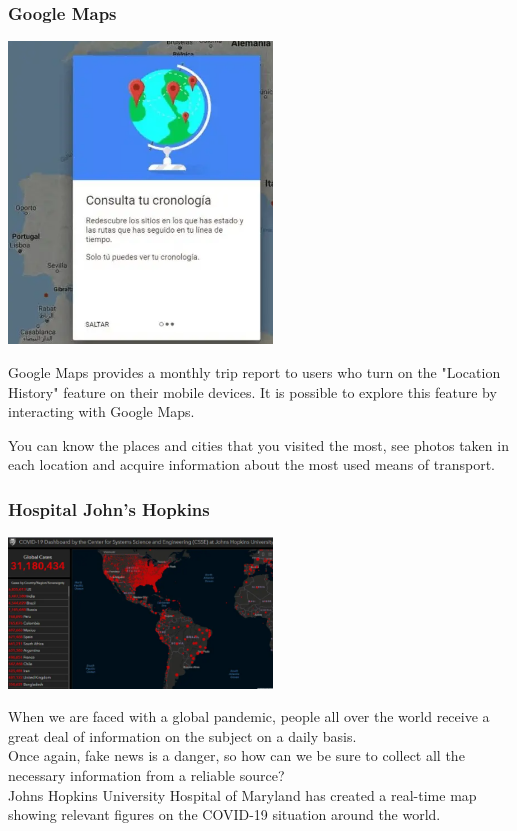 \documentclass{article}
\begin{document}
\begin{multicols}{2}
\subsubsection{Google Maps}
\begin{center}
	\includegraphics[width=7cm]{./images/6.png} 
\end{center}
Google Maps provides a monthly trip report to users who turn on the "Location History" feature on their mobile devices. It is possible to explore this feature by interacting with Google Maps.

You can know the places and cities that you visited the most, see photos taken in each location and acquire information about the most used means of transport.
 
 \subsubsection{Hospital John's Hopkins}
\begin{center}
	\includegraphics[width=7cm]{./images/7.png} 
\end{center}
When we are faced with a global pandemic, people all over the world receive a great deal of information on the subject on a daily basis.\\
Once again, fake news is a danger, so how can we be sure to collect all the necessary information from a reliable source?
\\
Johns Hopkins University Hospital of Maryland has created a real-time map showing relevant figures on the COVID-19 situation around the world.










\end{multicols}
\end{document}

